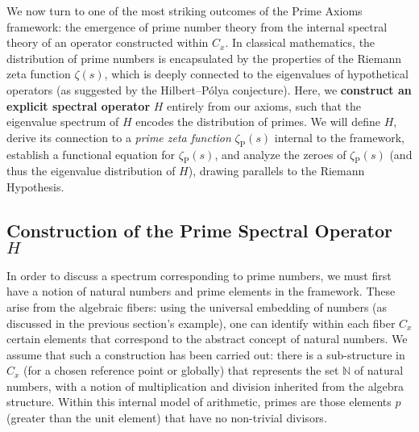\documentclass[11pt]{article}
\begin{document}
We now turn to one of the most striking outcomes of the Prime Axioms framework: the emergence of prime number theory from the internal spectral theory of an operator constructed within $C_x$. In classical mathematics, the distribution of prime numbers is encapsulated by the properties of the Riemann zeta function $\zeta(s)$, which is deeply connected to the eigenvalues of hypothetical operators (as suggested by the Hilbert–Pólya conjecture). Here, we \textbf{construct an explicit spectral operator} $H$ entirely from our axioms, such that the eigenvalue spectrum of $H$ encodes the distribution of primes. We will define $H$, derive its connection to a \emph{prime zeta function} $\zeta_{\mathrm{P}}(s)$ internal to the framework, establish a functional equation for $\zeta_{\mathrm{P}}(s)$, and analyze the zeroes of $\zeta_{\mathrm{P}}(s)$ (and thus the eigenvalue distribution of $H$), drawing parallels to the Riemann Hypothesis.

\subsection*{Construction of the Prime Spectral Operator $H$}

In order to discuss a spectrum corresponding to prime numbers, we must first have a notion of natural numbers and prime elements in the framework. These arise from the algebraic fibers: using the universal embedding of numbers (as discussed in the previous section's example), one can identify within each fiber $C_x$ certain elements that correspond to the abstract concept of natural numbers. We assume that such a construction has been carried out: there is a sub-structure in $C_x$ (for a chosen reference point or globally) that represents the set $\mathbb{N}$ of natural numbers, with a notion of multiplication and division inherited from the algebra structure. Within this internal model of arithmetic, primes are those elements $p$ (greater than the unit element) that have no non-trivial divisors.
\end{document}
